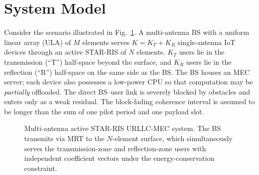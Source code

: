 \documentclass[journal]{IEEEtran}
\newcommand{\vect}[1]{\bm{#1}}
\newcommand{\mat}[1]{\mathbf{#1}}
\newcommand{\C}{\mathbb{C}}
\begin{document}
\section{System Model}
\label{sec:sysmodel}

Consider the scenario illustrated in Fig.~\ref{fig:system}.
A multi-antenna BS with a uniform linear array (ULA) of $M$ elements
serves $K = K_T + K_R$ single-antenna IoT devices through an active
STAR-RIS of $N$ elements. $K_T$ users lie in the transmission
(``T'') half-space beyond the surface, and $K_R$ users lie in the
reflection (``R'') half-space on the same side as the BS. The BS
houses an MEC server; each device also possesses a low-power CPU
so that computation may be \emph{partially} offloaded. The direct
BS--user link is severely blocked by obstacles and enters only as a
weak residual. The block-fading coherence interval is assumed to be
longer than the sum of one pilot period and one payload slot.

\begin{figure}[t]
  \centering
  \caption{Multi-antenna active STAR-RIS URLLC-MEC system. The BS
  transmits via MRT to the $N$-element surface, which simultaneously
  serves the transmission-zone and reflection-zone users with
  independent coefficient vectors under the energy-conservation
  constraint.}
  \label{fig:system}
\end{figure}
\end{document}
